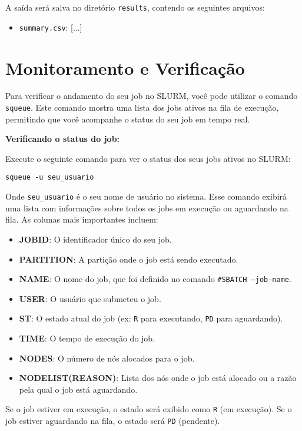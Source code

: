 \documentclass[a4paper, 12pt]{article}
\begin{document}
A saída será salva no diretório \texttt{results}, contendo os seguintes arquivos:

\begin{itemize}
  \item \texttt{summary.csv}: [...]
\end{itemize}


\section{Monitoramento e Verificação}

Para verificar o andamento do seu job no SLURM, você pode utilizar o comando \texttt{squeue}. Este comando mostra uma lista dos jobs ativos na fila de execução, permitindo que você acompanhe o status do seu job em tempo real.

\textbf{Verificando o status do job:}

Execute o seguinte comando para ver o status dos seus jobs ativos no SLURM:

\begin{verbatim}
squeue -u seu_usuario
\end{verbatim}

Onde \texttt{seu\_usuario} é o seu nome de usuário no sistema. Esse comando exibirá uma lista com informações sobre todos os jobs em execução ou aguardando na fila. As colunas mais importantes incluem:

\begin{itemize}
  \item \textbf{JOBID}: O identificador único do seu job.
  \item \textbf{PARTITION}: A partição onde o job está sendo executado.
  \item \textbf{NAME}: O nome do job, que foi definido no comando \texttt{\#SBATCH --job-name}.
  \item \textbf{USER}: O usuário que submeteu o job.
  \item \textbf{ST}: O estado atual do job (ex: \texttt{R} para executando, \texttt{PD} para aguardando).
  \item \textbf{TIME}: O tempo de execução do job.
  \item \textbf{NODES}: O número de nós alocados para o job.
  \item \textbf{NODELIST(REASON)}: Lista dos nós onde o job está alocado ou a razão pela qual o job está aguardando.
\end{itemize}

Se o job estiver em execução, o estado será exibido como \texttt{R} (em execução). Se o job estiver aguardando na fila, o estado será \texttt{PD} (pendente).
\end{document}
